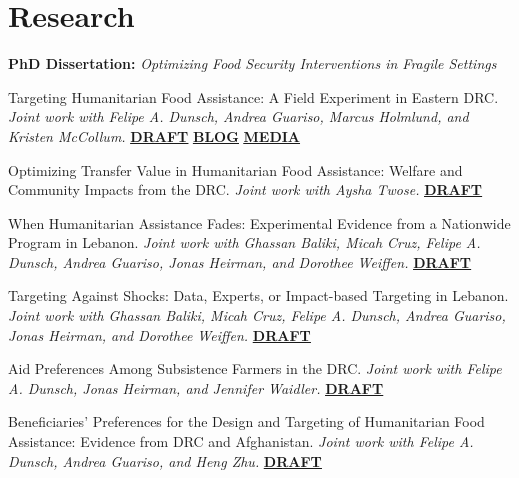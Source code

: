 \documentclass[10pt]{article}
\newcommand{\link}[2]{\href{#1}{\textcolor{cvloc}{\textbf{\underline{#2}}}}}
\begin{document}
\vspace{4pt}
\section{Research}
\textbf{PhD Dissertation:} \textit{Optimizing Food Security Interventions in Fragile Settings}\par
\begin{sqlist}[itemsep=8pt]
  \item Targeting Humanitarian Food Assistance: A Field Experiment in Eastern DRC. \textit{Joint work with Felipe A. Dunsch, Andrea Guariso, Marcus Holmlund, and Kristen McCollum.} \link{https://jonathangarciaf.github.io/files/papers/Data_Driven_vs_CBT_DRC.pdf}{DRAFT} \link{https://wfp-evaluation.medium.com/optimizing-targeting-of-humanitarian-food-assistance-in-the-drc-precision-and-coverage-29c6d39d2ee9}{BLOG} \link{https://www.povertyactionlab.org/blog/7-21-25/evidence-effect-evidence-action-conflict-and-crisis}{MEDIA}
  \item Optimizing Transfer Value in Humanitarian Food Assistance: Welfare and Community Impacts from the DRC. \textit{Joint work with Aysha Twose.} \link{https://jonathangarciaf.github.io/files/papers/garcia-twose-optimizing-transfer-value-drc.pdf}{DRAFT}
  \item When Humanitarian Assistance Fades: Experimental Evidence from a Nationwide Program in Lebanon. \textit{Joint work with Ghassan Baliki, Micah Cruz, Felipe A. Dunsch, Andrea Guariso, Jonas Heirman, and Dorothee Weiffen.} \link{https://jonathangarciaf.github.io/files/papers/baliki-et-al-when-humanitarian-assistance-fades-lebanon.pdf}{DRAFT}
  \item Targeting Against Shocks: Data, Experts, or Impact-based Targeting in Lebanon. \textit{Joint work with Ghassan Baliki, Micah Cruz, Felipe A. Dunsch, Andrea Guariso, Jonas Heirman, and Dorothee Weiffen.} \link{https://jonathangarciaf.github.io/files/papers/targeting-against-shocks.pdf}{DRAFT}
  \item Aid Preferences Among Subsistence Farmers in the DRC. \textit{Joint work with Felipe A. Dunsch, Jonas Heirman, and Jennifer Waidler.} \link{https://jonathangarciaf.github.io/files/papers/intra-household-dce-sk.pdf}{DRAFT}
  \item Beneficiaries' Preferences for the Design and Targeting of Humanitarian Food Assistance: Evidence from DRC and Afghanistan. \textit{Joint work with Felipe A. Dunsch, Andrea Guariso, and Heng Zhu.} \link{https://jonathangarciaf.github.io/files/papers/drc-afg-dce-humanitarian.pdf}{DRAFT}
\end{sqlist}
\end{document}
